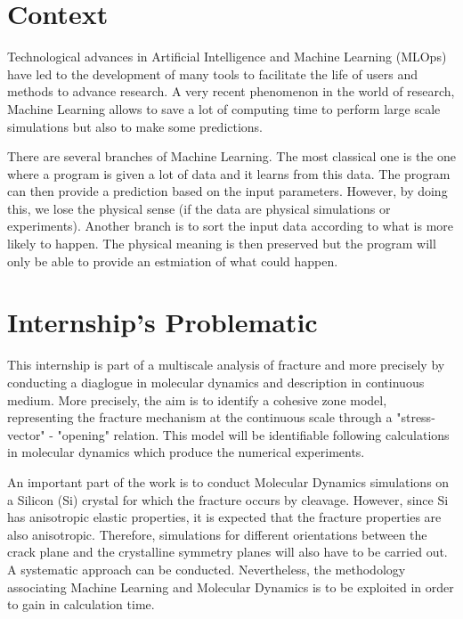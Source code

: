 
\section{Context} %

    Technological advances in Artificial Intelligence and Machine Learning (MLOps) have led to the development of many tools to facilitate the life of users and methods to advance research. A very recent phenomenon in the world of research, Machine Learning allows to save a lot of computing time to perform large scale simulations but also to make some predictions. 
    
    There are several branches of Machine Learning. The most classical one is the one where a program is given a lot of data and it learns from this data. The program can then provide a prediction based on the input parameters. However, by doing this, we lose the physical sense (if the data are physical simulations or experiments). Another branch is to sort the input data according to what is more likely to happen. The physical meaning is then preserved but the program will only be able to provide an estmiation of what could happen. 

\section{Internship's Problematic}

    This internship is part of a multiscale analysis of fracture and more precisely by conducting a diaglogue in molecular dynamics and description in continuous medium. More precisely, the aim is to identify a cohesive zone model, representing the fracture mechanism at the continuous scale through a "stress-vector" - "opening" relation. This model will be identifiable following calculations in molecular dynamics which produce the numerical experiments. \medskip

    An important part of the work is to conduct Molecular Dynamics simulations on a Silicon (Si) crystal for which the fracture occurs by cleavage. However, since Si has anisotropic elastic properties, it is expected that the fracture properties are also anisotropic. Therefore, simulations for different orientations between the crack plane and the crystalline symmetry planes will also have to be carried out. A systematic approach can be conducted. Nevertheless, the methodology associating Machine Learning and Molecular Dynamics is to be exploited in order to gain in calculation time. \medskip
    

